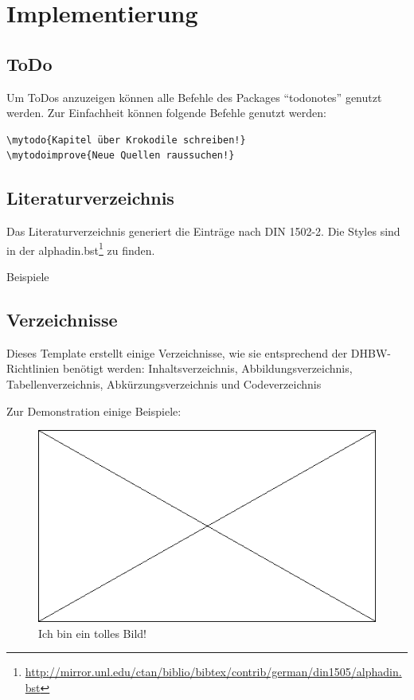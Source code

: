 \chapter{Implementierung}

\section{ToDo}

Um ToDos anzuzeigen können alle Befehle des Packages \enquote{todonotes} genutzt werden.
Zur Einfachheit können folgende Befehle genutzt werden:

\begin{verbatim}
\mytodo{Kapitel über Krokodile schreiben!}
\mytodoimprove{Neue Quellen raussuchen!}
\end{verbatim}


\section{Literaturverzeichnis}

Das Literaturverzeichnis generiert die Einträge nach DIN 1502-2. Die Styles sind in der alphadin.bst\footnote{\url{http://mirror.unl.edu/ctan/biblio/bibtex/contrib/german/din1505/alphadin.bst}} zu finden.

Beispiele \cite{web:wiki:latex,book:komascript}

\section{Verzeichnisse}

Dieses Template erstellt einige Verzeichnisse, wie sie entsprechend der DHBW-Richtlinien benötigt werden: Inhaltsverzeichnis, Abbildungsverzeichnis, Tabellenverzeichnis, Abkürzungsverzeichnis und Codeverzeichnis

Zur Demonstration einige Beispiele:

\begin{figure}[H]
\centering
\includegraphics[width=\textwidth]{Images/placeholder.png}
\caption{Ich bin ein tolles Bild!}
\end{figure}

